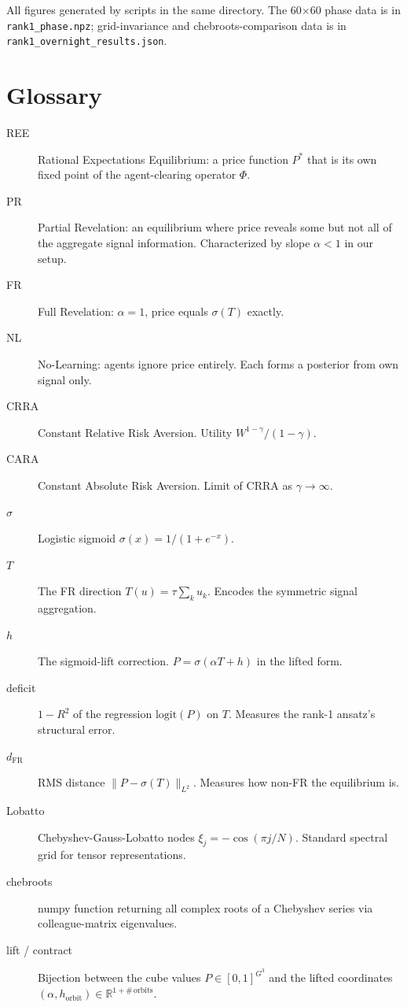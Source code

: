 \documentclass[11pt]{article}
\begin{document}
All figures generated by scripts in the same directory. The 60$\times$60 phase data
is in \texttt{rank1\_phase.npz}; grid-invariance and chebroots-comparison data is in
\texttt{rank1\_overnight\_results.json}.

\section{Glossary}

\begin{description}
\item[REE] Rational Expectations Equilibrium: a price function $P^*$ that is its own
fixed point of the agent-clearing operator $\Phi$.
\item[PR] Partial Revelation: an equilibrium where price reveals some but not all of
the aggregate signal information. Characterized by slope $\alpha < 1$ in our setup.
\item[FR] Full Revelation: $\alpha = 1$, price equals $\sigma(T)$ exactly.
\item[NL] No-Learning: agents ignore price entirely. Each forms a posterior from
own signal only.
\item[CRRA] Constant Relative Risk Aversion. Utility $W^{1-\gamma}/(1-\gamma)$.
\item[CARA] Constant Absolute Risk Aversion. Limit of CRRA as $\gamma\to\infty$.
\item[$\sigma$] Logistic sigmoid $\sigma(x) = 1/(1+e^{-x})$.
\item[$T$] The FR direction $T(u) = \tau \sum_k u_k$. Encodes the symmetric signal aggregation.
\item[$h$] The sigmoid-lift correction. $P = \sigma(\alpha T + h)$ in the lifted form.
\item[deficit] $1 - R^2$ of the regression $\mathrm{logit}(P)$ on $T$. Measures
the rank-1 ansatz's structural error.
\item[$d_{\mathrm{FR}}$] RMS distance $\|P - \sigma(T)\|_{L^2}$. Measures how
non-FR the equilibrium is.
\item[Lobatto] Chebyshev-Gauss-Lobatto nodes $\xi_j = -\cos(\pi j/N)$. Standard
spectral grid for tensor representations.
\item[chebroots] numpy function returning all complex roots of a Chebyshev series via
colleague-matrix eigenvalues.
\item[lift / contract] Bijection between the cube values $P\in[0,1]^{G^3}$ and the
lifted coordinates $(\alpha, h_{\mathrm{orbit}})\in\mathbb R^{1+\#\,\mathrm{orbits}}$.
\end{description}
\end{document}
